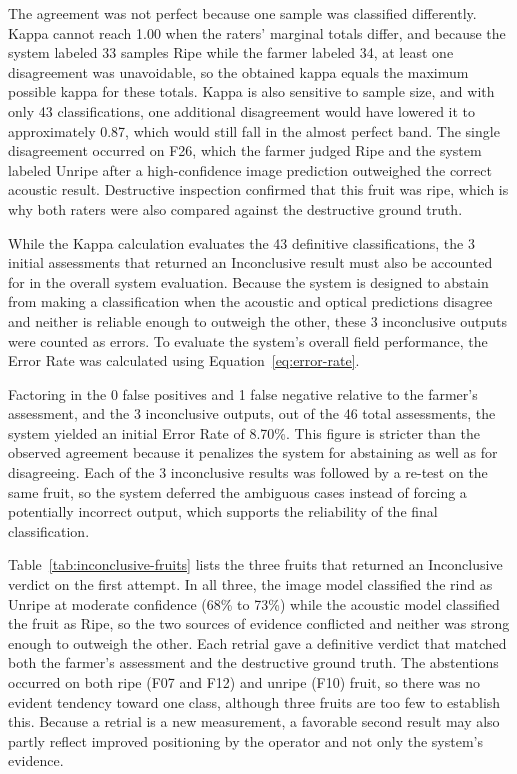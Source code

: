 \begin{thesisprose}
The agreement was not perfect because one sample was classified differently. Kappa cannot reach 1.00 when the raters' marginal totals differ, and because the system labeled 33 samples Ripe while the farmer labeled 34, at least one disagreement was unavoidable, so the obtained kappa equals the maximum possible kappa for these totals. Kappa is also sensitive to sample size, and with only 43 classifications, one additional disagreement would have lowered it to approximately 0.87, which would still fall in the almost perfect band. The single disagreement occurred on F26, which the farmer judged Ripe and the system labeled Unripe after a high-confidence image prediction outweighed the correct acoustic result. Destructive inspection confirmed that this fruit was ripe, which is why both raters were also compared against the destructive ground truth.

While the Kappa calculation evaluates the 43 definitive classifications, the 3 initial assessments that returned an Inconclusive result must also be accounted for in the overall system evaluation. Because the system is designed to abstain from making a classification when the acoustic and optical predictions disagree and neither is reliable enough to outweigh the other, these 3 inconclusive outputs were counted as errors. To evaluate the system's overall field performance, the Error Rate was calculated using Equation~\eqref{eq:error-rate}.

Factoring in the 0 false positives and 1 false negative relative to the farmer's assessment, and the 3 inconclusive outputs, out of the 46 total assessments, the system yielded an initial Error Rate of 8.70\%. This figure is stricter than the observed agreement because it penalizes the system for abstaining as well as for disagreeing. Each of the 3 inconclusive results was followed by a re-test on the same fruit, so the system deferred the ambiguous cases instead of forcing a potentially incorrect output, which supports the reliability of the final classification.


Table~\ref{tab:inconclusive-fruits} lists the three fruits that returned an Inconclusive verdict on the first attempt. In all three, the image model classified the rind as Unripe at moderate confidence (68\% to 73\%) while the acoustic model classified the fruit as Ripe, so the two sources of evidence conflicted and neither was strong enough to outweigh the other. Each retrial gave a definitive verdict that matched both the farmer's assessment and the destructive ground truth. The abstentions occurred on both ripe (F07 and F12) and unripe (F10) fruit, so there was no evident tendency toward one class, although three fruits are too few to establish this. Because a retrial is a new measurement, a favorable second result may also partly reflect improved positioning by the operator and not only the system's evidence.


\end{thesisprose}
